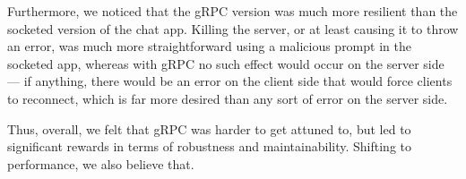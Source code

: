 \documentclass[
	a4paper, %
	10pt, %
	unnumberedsections, %
	twoside, %
]{LTJournalArticle}
\begin{document}
Furthermore, we noticed that the gRPC version was much more resilient than the socketed version of the chat app. Killing the server, or at least causing it to throw an error, was much more straightforward using a malicious prompt in the socketed app, whereas with gRPC no such effect would occur on the server side --- if anything, there would be an error on the client side that would force clients to reconnect, which is far more desired than any sort of error on the server side.

Thus, overall, we felt that gRPC was harder to get attuned to, but led to significant rewards in terms of robustness and maintainability. Shifting to performance, we also believe that.
\end{document}
